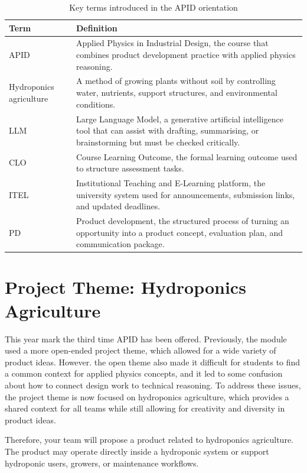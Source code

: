 \begin{table}[htbp]
\centering
\caption{Key terms introduced in the APID orientation}
\label{tab:session0-key-terms}
\renewcommand{\arraystretch}{1.2}
\begin{tabularx}{\textwidth}{|>{\raggedright\arraybackslash}p{}|X|}
\hline
\textbf{Term} & \textbf{Definition} \\
\hline
APID & Applied Physics in Industrial Design, the course that combines product development practice with applied physics reasoning. \\
\hline
Hydroponics agriculture & A method of growing plants without soil by controlling water, nutrients, support structures, and environmental conditions. \\
\hline
LLM & Large Language Model, a generative artificial intelligence tool that can assist with drafting, summarising, or brainstorming but must be checked critically. \\
\hline
CLO & Course Learning Outcome, the formal learning outcome used to structure assessment tasks. \\
\hline
ITEL & Institutional Teaching and E-Learning platform, the university system used for announcements, submission links, and updated deadlines. \\
\hline
PD & Product development, the structured process of turning an opportunity into a product concept, evaluation plan, and communication package. \\
\hline
\end{tabularx}
\end{table}

\section{Project Theme: Hydroponics Agriculture}


This year mark the third time APID has been offered. Previously, the module used a more open-ended project theme, which allowed for a wide variety of product ideas. However. the open theme also made it difficult for students to find a common context for applied physics concepts, and it led to some confusion about how to connect design work to technical reasoning. To address these issues, the project theme is now focused on hydroponics agriculture, which provides a shared context for all teams while still allowing for creativity and diversity in product ideas. 

Therefore, your team will propose a product related to hydroponics agriculture. The product may operate directly inside a hydroponic system or support hydroponic users, growers, or maintenance workflows.

